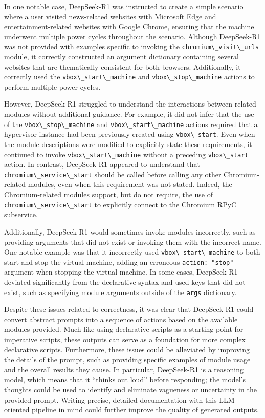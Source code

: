 \documentclass[final,5p,times,twocolumn]{elsarticle}
\newcommand{\passthrough}[1]{#1}
\begin{document}
In one notable case, DeepSeek-R1 was instructed to create a simple
scenario where a user visited news-related websites with Microsoft Edge
and entertainment-related websites with Google Chrome, ensuring that the
machine underwent multiple power cycles throughout the scenario.
Although DeepSeek-R1 was not provided with examples specific to invoking
the \passthrough{\lstinline!chromium\_visit\_urls!} module, it correctly
constructed an argument dictionary containing several websites that are
thematically consistent for both browsers. Additionally, it correctly
used the \passthrough{\lstinline!vbox\_start\_machine!} and
\passthrough{\lstinline!vbox\_stop\_machine!} actions to perform
multiple power cycles.

However, DeepSeek-R1 struggled to understand the interactions between
related modules without additional guidance. For example, it did not
infer that the use of the \passthrough{\lstinline!vbox\_stop\_machine!}
and \passthrough{\lstinline!vbox\_start\_machine!} actions required that
a hypervisor instance had been previously created using
\passthrough{\lstinline!vbox\_start!}. Even when the module descriptions
were modified to explicitly state these requirements, it continued to
invoke \passthrough{\lstinline!vbox\_start\_machine!} without a
preceding \passthrough{\lstinline!vbox\_start!} action. In contrast,
DeepSeek-R1 appeared to understand that
\passthrough{\lstinline!chromium\_service\_start!} should be called
before calling any other Chromium-related modules, even when this
requirement was not stated. Indeed, the Chromium-related modules
support, but do not require, the use of
\passthrough{\lstinline!chromium\_service\_start!} to explicitly connect
to the Chromium RPyC subservice.

Additionally, DeepSeek-R1 would sometimes invoke modules incorrectly,
such as providing arguments that did not exist or invoking them with the
incorrect name. One notable example was that it incorrectly used
\passthrough{\lstinline!vbox\_start\_machine!} to both start and stop
the virtual machine, adding an erroneous
\passthrough{\lstinline!action: "stop"!} argument when stopping the
virtual machine. In some cases, DeepSeek-R1 deviated significantly from
the declarative syntax and used keys that did not exist, such as
specifying module arguments outside of the
\passthrough{\lstinline!args!} dictionary.

Despite these issues related to correctness, it was clear that
DeepSeek-R1 could convert abstract prompts into a sequence of actions
based on the available modules provided. Much like using declarative
scripts as a starting point for imperative scripts, these outputs can
serve as a foundation for more complex declarative scripts. Furthermore,
these issues could be alleviated by improving the details of the prompt,
such as providing specific examples of module usage and the overall
results they cause. In particular, DeepSeek-R1 is a reasoning model,
which means that it ``thinks out loud'' before responding; the model's
thoughts could be used to identify and eliminate vagueness or
uncertainty in the provided prompt. Writing precise, detailed
documentation with this LLM-oriented pipeline in mind could further
improve the quality of generated outputs.
\end{document}
